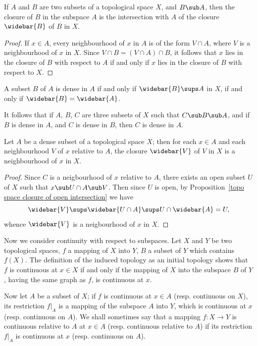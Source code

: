 \begin{proposition}\label{topological subspace closure char}
If $A$ and $B$ are two subsets of a topological space $X$, and $B\sub A$, then the closure of $B$ in the subspace $A$ is the intersection with $A$ of the closure $\widebar{B}$ of $B$ in $X$.
\end{proposition}
\begin{proof}
If $x\in A$, every neighbourhood of $x$ in $A$ is of the form $V\cap A$, where $V$ is a neighbourhood of $x$ in $X$. Since $V\cap B=(V\cap A)\cap B$, it follows that $x$ lies in the closure of $B$ with respect to $A$ if and only if $x$ lies in the closure of $B$ with respect to $X$.
\end{proof}
\begin{corollary}
A subset $B$ of $A$ is dense in $A$ if and only if $\widebar{B}\sups A$ in $X$, if and only if $\widebar{B}=\widebar{A}$.
\end{corollary}
\begin{corollary}\label{topo space transitivity of density}
It follows that if $A$, $B$, $C$ are three subsets of $X$ such that $C\sub B\sub A$, and if $B$ is dense in $A$, and $C$ is dense in $B$, then $C$ is dense in $A$.
\end{corollary}
\begin{proposition}\label{topological dense subspace closure of nbhd}
Let $A$ be a dense subset of a topological space $X$; then for each $x\in A$ and each neighbourhood $V$ of $x$ relative to $A$, the closure $\widebar{V}$ of $V$ in $X$ is a neighbourhood of $x$ in $X$.
\end{proposition}
\begin{proof}
Since $C$ is a neigbourhood of $x$ relative to $A$, there exists an open subset $U$ of $X$ such that $x\sub U\cap A\sub V$. Then since $U$ is open, by Proposition~\ref{topo space closure of open intersection} we have
\[\widebar{V}\sups\widebar{U\cap A}\sups U\cap\widebar{A}=U,\]
whence $\widebar{V}$ is a neigbourhood of $x$ in $X$.
\end{proof}
Now we consider continuity with respect to subspaces. Let $X$ and $Y$ be two topological spaces, $f$ a mapping of $X$ into $Y$, $B$ a subset of $Y$ which contains $f(X)$. The definition of the induced topology as an initial topology shows that $f$ is continuous at $x\in X$ if and only if the mapping of $X$ into the subspace $B$ of $Y$, having the same graph as $f$, is continuous at $x$.\par
Now let $A$ be a subset of $X$; if $f$ is continuous at $x\in A$ (resp. continuous on $X$), its restriction $f|_A$ is a mapping of the subspace $A$ into $Y$, which is continuous at $x$ (resp. continuous on $A$). We shall sometimes say that a mapping $f:X\to Y$ is continuous relative to $A$ at $x\in A$ (resp. continuous relative to $A$) if its restriction $f|_A$ is continuous at $x$ (resp. continuous on $A$).\par
